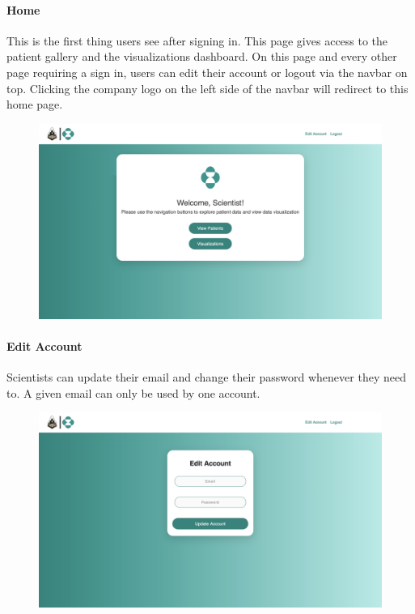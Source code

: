 \documentclass[]{book}
\let\oldparagraph\paragraph
\renewcommand{\paragraph}[1]{\oldparagraph{#1}\mbox{}}
\begin{document}
\paragraph{Home}\label{home}

This is the first thing users see after signing in. This page gives
access to the patient gallery and the visualizations dashboard. On this
page and every other page requiring a sign in, users can edit their
account or logout via the navbar on top. Clicking the company logo on
the left side of the navbar will redirect to this home page.

\begin{figure}
\centering
\includegraphics{images/home_page.png}
\caption{}
\end{figure}

\paragraph{Edit Account}\label{edit-account}

Scientists can update their email and change their password whenever
they need to. A given email can only be used by one account.

\begin{figure}
\centering
\includegraphics{images/Edit_Account.png}
\caption{}
\end{figure}
\end{document}
